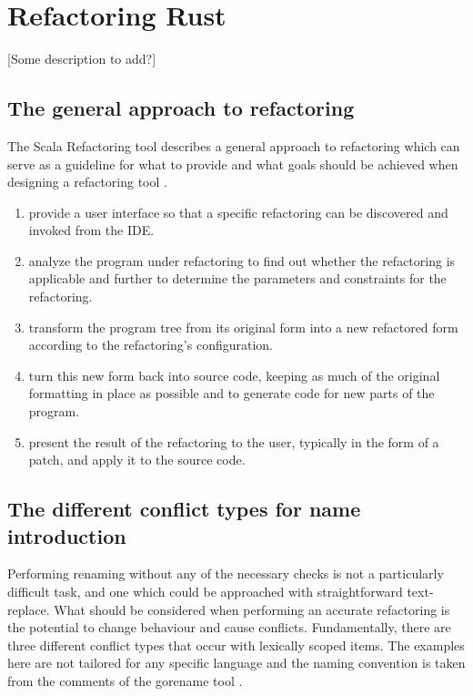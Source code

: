 \chapter{Refactoring Rust}\label{C:wd}

[Some description to add?]
\section{The general approach to refactoring}
The Scala Refactoring tool describes a general approach to refactoring which can serve as a guideline for what to provide and what goals should be achieved when designing a refactoring tool \cite{stocker2010scala}.
\begin{enumerate}
\item provide a user interface so that a specific refactoring can be discovered and invoked from the IDE.
\item analyze the program under refactoring to find out whether the refactoring is applicable and further to determine the parameters and constraints for the refactoring.
\item transform the program tree from its original form into a new refactored form according to the refactoring’s configuration.
\item turn this new form back into source code, keeping as much of the original formatting in place as possible and to generate code for new parts of the program.
\item present the result of the refactoring to the user, typically in the form of a patch, and apply it to the source code.
\end{enumerate}



\section{The different conflict types for name introduction}\label{S:different}
Performing renaming without any of the necessary checks is not a particularly difficult task, and one which could be approached with straightforward text-replace. What should be considered when performing an accurate refactoring is the potential to change behaviour and cause conflicts. Fundamentally, there are three different conflict types that occur with lexically scoped items. The examples here are not tailored for any specific language and the naming convention is taken from the comments of the gorename tool \cite{gorename15}.

